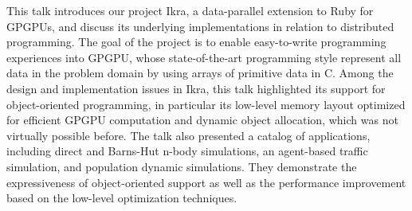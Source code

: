 This talk introduces our project Ikra, a data-parallel extension to Ruby for GPGPUs, and discuss its underlying implementations in relation to distributed programming.  The goal of the project is to enable easy-to-write programming experiences into GPGPU, whose state-of-the-art programming style represent all data in the problem domain by using arrays of primitive data in C. Among the design and implementation issues in Ikra, this talk highlighted its support for object-oriented programming, in particular its low-level memory layout optimized for efficient GPGPU computation and dynamic object allocation, which was not virtually possible before.   The talk also presented a catalog of applications, including direct and Barns-Hut n-body simulations, an agent-based traffic simulation, and population dynamic simulations.  They demonstrate the expressiveness of object-oriented support as well as the performance improvement based on the low-level optimization techniques.
